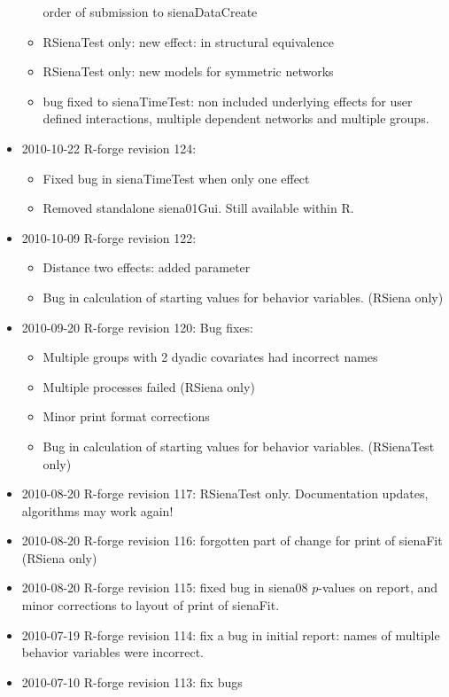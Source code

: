 \documentclass[a4paper,fleqn,11pt]{article}
\newcommand{\+}{\, + \,}
\newcommand{\Rn}{{\sf R}}
\begin{document}
\begin{small}
\begin{itemize}
\begin{itemize}
order of submission to sienaDataCreate
\item \textsf{RSienaTest} only: new effect: in structural equivalence
\item \textsf{RSienaTest} only: new models for symmetric networks
\item bug fixed to sienaTimeTest: non included underlying effects for user
  defined interactions, multiple dependent networks and multiple groups.
\end{itemize}
\item 2010-10-22 R-forge revision 124:
\begin{itemize}
\item Fixed bug in \textsf{sienaTimeTest} when only one effect
\item Removed standalone siena01Gui. Still available within \Rn.
\end{itemize}
\item 2010-10-09 R-forge revision 122:
\begin{itemize}
\item Distance two effects: added parameter
\item Bug in calculation of starting values for behavior variables.
(RSiena only)
\end{itemize}
\item 2010-09-20 R-forge revision 120: Bug fixes:
\begin{itemize}
\item Multiple groups with 2 dyadic covariates had incorrect names
\item Multiple processes failed (RSiena only)
\item Minor print format corrections
\item Bug in calculation of starting values for behavior variables.
(RSienaTest only)
\end{itemize}
\item 2010-08-20 R-forge revision 117: \textsf{RSienaTest} only. Documentation updates,
algorithms may work again!
\item 2010-08-20 R-forge revision 116: forgotten
part of change for print of sienaFit (RSiena only)
\item 2010-08-20 R-forge revision 115: fixed bug in \textsf{siena08} $p$-values on report,
and minor corrections to layout of print of sienaFit.
\item 2010-07-19 R-forge revision 114: fix a bug in initial report: names of
  multiple behavior variables were incorrect.
\item 2010-07-10 R-forge revision 113: fix bugs

\end{itemize}
\end{small}
\end{document}
